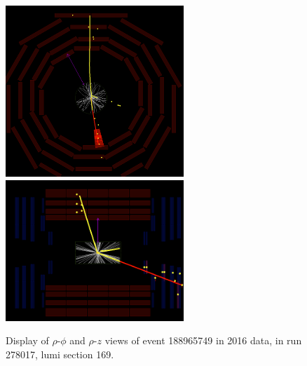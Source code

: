 \begin{figure}[htpb]
  \centering
  \includegraphics[width=0.6\textwidth]{figures/displaced/event-278017_188965749_169_RhoPhi.png}
  \includegraphics[width=0.6\textwidth]{figures/displaced/event-278017_188965749_169_RhoZ.png}
  \caption{Display of $\rho$-$\phi$ and $\rho$-$z$ views of event 188965749 in 2016 data, in run 278017, lumi section 169.}
  \label{fig:dd:event-169}
\end{figure}

